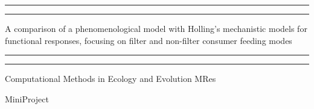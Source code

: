 \documentclass[11pt, a4paper, titlepage]{article}
\begin{document}
\begin{titlepage} %
	
	\centering %
	
	\scshape %
	
	\vspace*{\baselineskip} %
	
	
	
	
	\rule{\textwidth}{1.6pt}\vspace*{-\baselineskip}\vspace*{2pt} %
	
	\rule{\textwidth}{0.4pt} %
	
	\vspace{0.75\baselineskip} %
	
	{\LARGE A comparison of a phenomenological model with Holling's mechanistic models for functional responses, focusing on filter and non-filter consumer feeding modes\\} %
	
	\vspace{0.75\baselineskip} %
	
	\rule{\textwidth}{0.4pt}\vspace*{-\baselineskip}\vspace{3.2pt} %
	
	\rule{\textwidth}{1.6pt} %
	
	\vspace{2\baselineskip} %
	
	
	
	
	Computational Methods in Ecology and Evolution MRes
	\vspace{0.5\baselineskip}
	
	 MiniProject %
	
	\vspace*{3\baselineskip} %
	

\end{titlepage}
\end{document}
